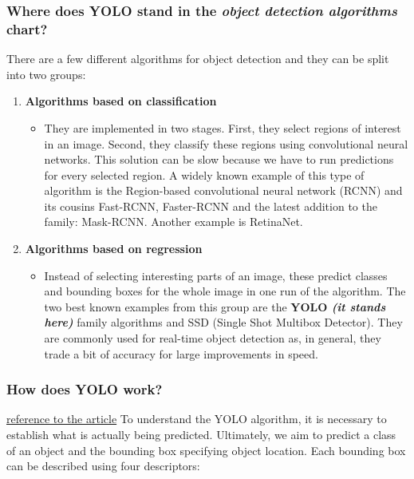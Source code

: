 \documentclass[a4paper]{article}
\begin{document}
\subsubsection{Where does YOLO stand in the \textit{object detection algorithms} chart?}
There are a few different algorithms for object detection and they can be split into two groups:
\begin{enumerate}
    \item \textbf{Algorithms based on classification}
          \begin{itemize}[label={}]
              \item They are implemented in two stages. First, they select regions of interest in an image. Second, they classify these regions using convolutional neural networks. This solution can be slow because we have to run predictions for every selected region. A widely known example of this type of algorithm is the Region-based convolutional neural network (RCNN) and its cousins Fast-RCNN, Faster-RCNN and the latest addition to the family: Mask-RCNN. Another example is RetinaNet.
          \end{itemize}

    \item \textbf{Algorithms based on regression}
          \begin{itemize}[label={}]
              \item Instead of selecting interesting parts of an image, these predict classes and bounding boxes for the whole image in one run of the algorithm. The two best known examples from this group are the \textbf{YOLO \textit{(it stands here)}} family algorithms and SSD (Single Shot Multibox Detector). They are commonly used for real-time object detection as, in general, they trade a bit of accuracy for large improvements in speed.
          \end{itemize}
\end{enumerate}

\subsubsection{How does YOLO work?}
\textcolor{green}{\href{https://appsilon.com/object-detection-yolo-algorithm/}{reference to the article}}
To understand the YOLO algorithm, it is necessary to establish what is actually being predicted. Ultimately, we aim to predict a class of an object and the bounding box specifying object location. Each bounding box can be described using four descriptors:
\end{document}

